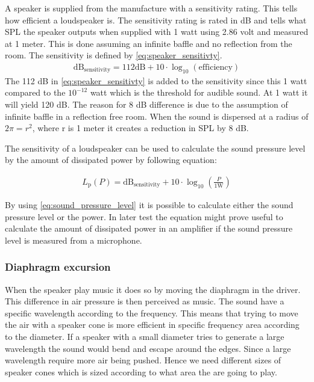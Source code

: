 A speaker is supplied from the manufacture with a sensitivity rating. This tells how efficient a loudspeaker is. The sensitivity rating is rated in dB and tells what \gls{SPL} the speaker outputs when supplied with 1 watt using 2.86 volt and measured at 1 meter. This is done assuming an infinite baffle and no reflection from the room. The sensitivity is defined by \autoref{eq:speaker_sensitivty}.
\begin{align}\label{eq:speaker_sensitivty}
\text{dB}_\text{sensitivity}=112\text {dB} +10 \cdot \log_{10}(\text{efficiency})
\end{align}  
The 112 dB in \autoref{eq:speaker_sensitivty} is added to the sensitivity since this 1 watt compared to the $10^{-12}$ watt which is the threshold for audible sound. At 1 watt it will yield 120 dB. The reason for 8 dB difference is due to the assumption of infinite baffle in a reflection free room. When the sound is dispersed at a radius of $2\pi=r^2$, where r is 1 meter it creates a reduction in \gls{SPL} by 8 dB.

The sensitivity of a loudspeaker can be used to calculate the sound pressure level by the amount of dissipated power by following equation:

\begin{align}\label{eq:sound_pressure_level}
L_\text{p}(P)=\text{dB}_\text{sensitivity} + 10\cdot \log_{10} \left(\frac{P}{1 \text{W}}\right)
\end{align} 

By using \autoref{eq:sound_pressure_level} it is possible to calculate either the sound pressure level or the power. In later test the equation might prove useful to calculate the amount of dissipated power in an amplifier if the sound pressure level is measured from a microphone.

\subsubsection*{Diaphragm excursion}

When the speaker play music it does so by moving the diaphragm in the driver. This difference in air pressure is then perceived as music. The sound have a specific wavelength according to the frequency. This means that trying to move the air with a speaker cone is more efficient in specific frequency area according to the diameter. If a speaker with a small diameter tries to generate a large wavelength the sound would bend and escape around the edges. Since a large wavelength require more air being pushed. Hence we need different sizes of speaker cones which is sized according to what area the are going to play.

